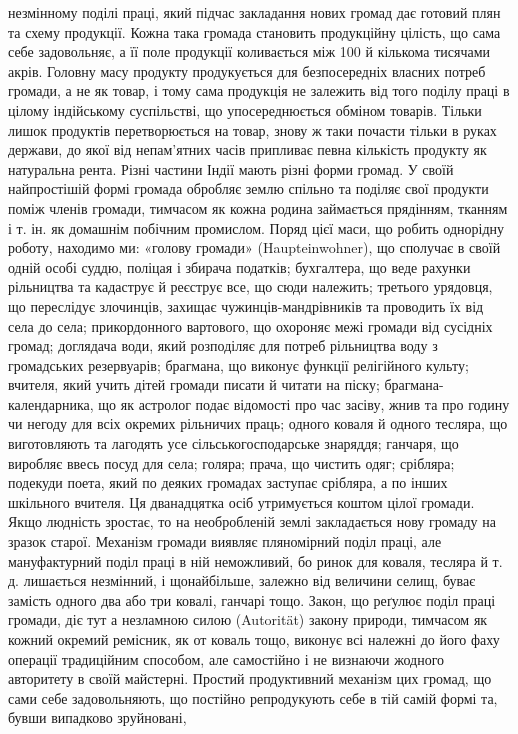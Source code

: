 \parcont{}  %
незмінному поділі праці, який підчас закладання нових громад
дає готовий плян та схему продукції. Кожна така громада становить
продукційну цілість, що сама себе задовольняє, а її поле
продукції коливається між 100 й кількома тисячами акрів. Головну
масу продукту продукується для безпосередніх власних
потреб громади, а не як товар, і тому сама продукція не залежить
від того поділу праці в цілому індійському суспільстві, що упосереднюється
обміном товарів. Тільки лишок продуктів перетворюється
на товар, знову ж таки почасти тільки в руках держави,
до якої від непам’ятних часів припливає певна кількість продукту
як натуральна рента. Різні частини Індії мають різні
форми громад. У своїй найпростішій формі громада обробляє
землю спільно та поділяє свої продукти поміж членів громади,
тимчасом як кожна родина займається прядінням, тканням і т. ін.
як домашнім побічним промислом. Поряд цієї маси, що робить
однорідну роботу, находимо ми: «голову громади» (Haupteinwohner),
що сполучає в своїй одній особі суддю, поліцая і збирача
податків; бухгалтера, що веде рахунки рільництва та кадаструє
й реєструє все, що сюди належить; третього урядовця, що переслідує
злочинців, захищає чужинців-мандрівників та проводить
їх від села до села; прикордонного вартового, що охороняє межі
громади від сусідніх громад; доглядача води, який розподіляє
для потреб рільництва воду з громадських резервуарів; брагмана,
що виконує функції релігійного культу; вчителя, який учить
дітей громади писати й читати на піску; брагмана-календарника,
що як астролог подає відомості про час засіву, жнив та про годину
чи негоду для всіх окремих рільничих праць; одного коваля й
одного тесляра, що виготовляють та лагодять усе сільськогосподарське
знаряддя; ганчаря, що виробляє ввесь посуд для
села; голяра; прача, що чистить одяг; срібляра; подекуди поета,
який по деяких громадах заступає срібляра, а по інших шкільного
вчителя. Ця дванадцятка осіб утримується коштом цілої
громади. Якщо людність зростає, то на необробленій землі закладається
нову громаду на зразок старої. Механізм громади виявляє
пляномірний поділ праці, але мануфактурний поділ праці в ній
неможливий, бо ринок для коваля, тесляра й т. д. лишається незмінний,
і щонайбільше, залежно від величини селищ, буває
замість одного два або три ковалі, ганчарі тощо. Закон, що
реґулює поділ праці громади, діє тут а незламною силою (Autorität)
закону природи, тимчасом як кожний окремий ремісник,
як от коваль тощо, виконує всі належні до його фаху операції
традиційним способом, але самостійно і не визнаючи жодного
авторитету в своїй майстерні. Простий продуктивний механізм
цих громад, що сами себе задовольняють, що постійно репродукують
себе в тій самій формі та, бувши випадково зруйновані,
\parbreak{}  %
